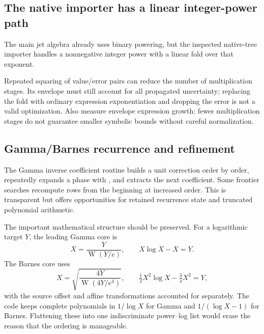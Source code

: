 \documentclass[11pt,a4paper]{article}
\newcommand{\code}[1]{\texttt{\detokenize{#1}}}
\newcommand{\W}{\operatorname{W}}
\begin{document}
\subsection{The native importer has a linear integer-power path}
The main jet algebra already uses binary powering, but the inspected native-tree importer handles a nonnegative integer power with a linear fold over that exponent.\cite{main,native}

Repeated squaring of value/error pairs can reduce the number of multiplication stages. Its envelope must still account for all propagated uncertainty; replacing the fold with ordinary expression exponentiation and dropping the error is not a valid optimization. Also measure envelope expression growth: fewer multiplication stages do not guarantee smaller symbolic bounds without careful normalization.

\subsection{Gamma/Barnes recurrence and refinement}
The Gamma inverse coefficient routine builds a unit correction order by order, repeatedly expands a phase with \code{Series}, and extracts the next coefficient. Some frontier searches recompute rows from the beginning at increased order. This is transparent but offers opportunities for retained recurrence state and truncated polynomial arithmetic.\cite{gamma}

The important mathematical structure should be preserved. For a logarithmic target $Y$, the leading Gamma core is
\[
 X=\frac{Y}{\W(Y/e)},\qquad X\log X-X=Y.
\]
The Barnes core uses
\[
 X=\sqrt{\frac{4Y}{\W(4Y/e^3)}},
 \qquad \tfrac12X^2\log X-\tfrac34X^2=Y,
\]
with the source offset and affine transformations accounted for separately. The code keeps complete polynomials in $1/\log X$ for Gamma and $1/(\log X-1)$ for Barnes. Flattening these into one indiscriminate power--log list would erase the reason that the ordering is manageable.\cite{gamma}
\end{document}
